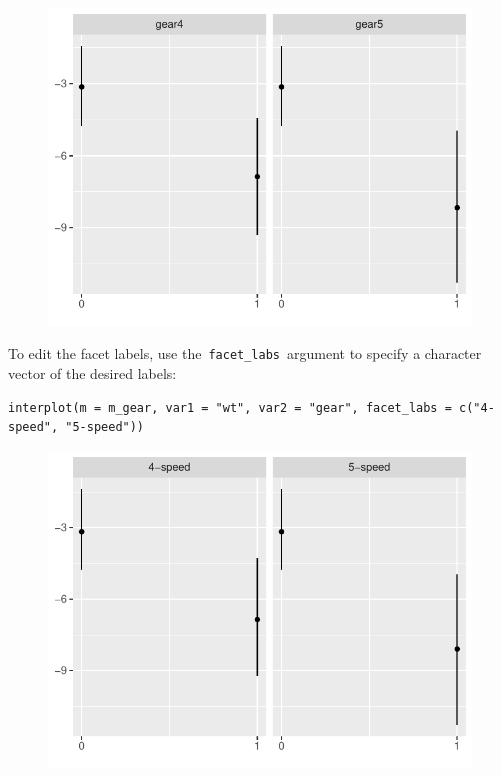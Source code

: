 \documentclass[
  article]{jss}
\begin{document}
\begin{figure}[H]

{\centering \includegraphics{jss_manuscript_files/figure-pdf/unnamed-chunk-10-1.pdf}

}

\end{figure}

To edit the facet labels, use the~\texttt{facet\_labs}~argument to
specify a character vector of the desired labels:

\begin{verbatim}
interplot(m = m_gear, var1 = "wt", var2 = "gear", facet_labs = c("4-speed", "5-speed"))
\end{verbatim}

\begin{figure}[H]

{\centering \includegraphics{jss_manuscript_files/figure-pdf/unnamed-chunk-11-1.pdf}

}

\end{figure}
\end{document}
